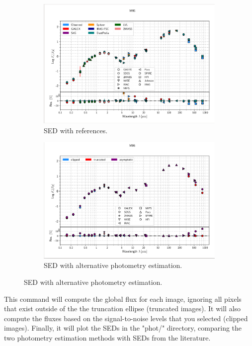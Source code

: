 \documentclass[15pt,a4paper,oneside,openright]{report}
\begin{document}
\begin{figure}[h!]
\begin{subfigure}{.5\textwidth}
  \centering
  \includegraphics[width=1.0\linewidth]{figures/sed_with_ref.png}
  \caption{SED with references.}
\end{subfigure}%
\begin{subfigure}{.5\textwidth}
  \centering
  \includegraphics[width=1.0\linewidth]{figures/sed_with_alt.png}
  \caption{SED with alternative photometry estimation.}
\end{subfigure}
\end{figure}

This command will compute the global flux for each image, ignoring all pixels that exist outside of the the truncation ellipse (truncated images). It will also compute the fluxes based on the signal-to-noise levels that you selected (clipped images). Finally, it will plot the SEDs in the "phot/" directory, comparing the two photometry estimation methods with SEDs from the literature.\\
\end{document}
